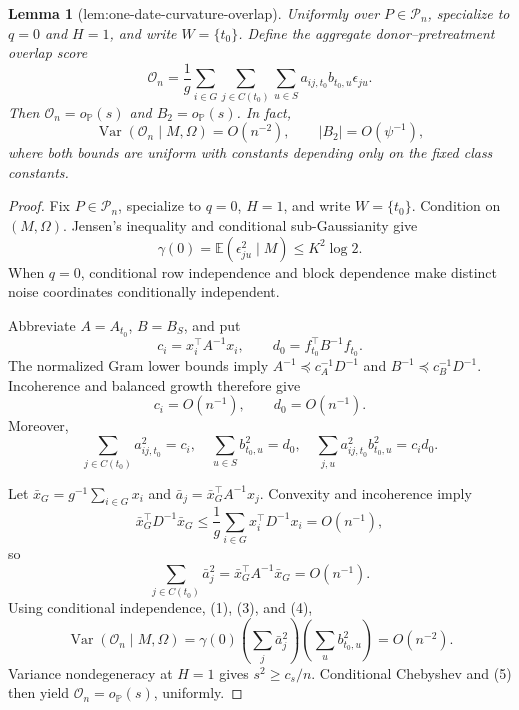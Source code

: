 \documentclass{article}
\newtheorem{lemma}{Lemma}
\begin{document}
\begin{lemma}[lem:one-date-curvature-overlap]\label{lem:one-date-curvature-overlap}
Uniformly over \(P\in\mathcal P_n\), specialize to \(q=0\) and \(H=1\), and write \(W=\{t_0\}\).  Define the aggregate donor--pretreatment overlap score
\[
 \mathcal O_n
 =\frac1g\sum_{i\in G}\sum_{j\in C(t_0)}\sum_{u\in S}
   a_{ij,t_0}b_{t_0,u}\epsilon_{ju}.
\]
Then \(\mathcal O_n=o_{\mathbb P}(s)\) and \(B_2=o_{\mathbb P}(s)\).  In fact,
\[
 \operatorname{Var}(\mathcal O_n\mid M,\Omega)=O(n^{-2}),
 \qquad |B_2|=O(\psi^{-1}),
\]
where both bounds are uniform with constants depending only on the fixed class constants.
\end{lemma}
\begin{proof}
Fix \(P\in\mathcal P_n\), specialize to \(q=0\), \(H=1\), and write \(W=\{t_0\}\).  Condition on \((M,\Omega)\).  Jensen's inequality and conditional sub-Gaussianity give
\[
 \gamma(0)=\mathbb E(\epsilon_{ju}^2\mid M)\le K^2\log2.
 \tag{1}
\]
When \(q=0\), conditional row independence and block dependence make distinct noise coordinates conditionally independent.

Abbreviate \(A=A_{t_0}\), \(B=B_S\), and put
\[
 c_i=x_i^{\top}A^{-1}x_i,
 \qquad d_0=f_{t_0}^{\top}B^{-1}f_{t_0}.
\]
The normalized Gram lower bounds imply \(A^{-1}\preceq c_A^{-1}D^{-1}\) and \(B^{-1}\preceq c_B^{-1}D^{-1}\).  Incoherence and balanced growth therefore give
\[
 c_i=O(n^{-1}),
 \qquad d_0=O(n^{-1}).
 \tag{2}
\]
Moreover,
\[
 \sum_{j\in C(t_0)}a_{ij,t_0}^2=c_i,
 \quad
 \sum_{u\in S}b_{t_0,u}^2=d_0,
 \quad
 \sum_{j,u}a_{ij,t_0}^2b_{t_0,u}^2=c_id_0.
 \tag{3}
\]

Let \(\bar x_G=g^{-1}\sum_{i\in G}x_i\) and \(\bar a_j=\bar x_G^{\top}A^{-1}x_j\).  Convexity and incoherence imply
\[
 \bar x_G^{\top}D^{-1}\bar x_G
 \le\frac1g\sum_{i\in G}x_i^{\top}D^{-1}x_i=O(n^{-1}),
\]
so
\[
 \sum_{j\in C(t_0)}\bar a_j^2
 =\bar x_G^{\top}A^{-1}\bar x_G=O(n^{-1}).
 \tag{4}
\]
Using conditional independence, (1), (3), and (4),
\[
 \operatorname{Var}(\mathcal O_n\mid M,\Omega)
 =\gamma(0)
 \left(\sum_j\bar a_j^2\right)
 \left(\sum_ub_{t_0,u}^2\right)=O(n^{-2}).
 \tag{5}
\]
Variance nondegeneracy at \(H=1\) gives \(s^2\ge c_s/n\).  Conditional Chebyshev and (5) then yield \(\mathcal O_n=o_{\mathbb P}(s)\), uniformly.


\end{proof}
\end{document}
